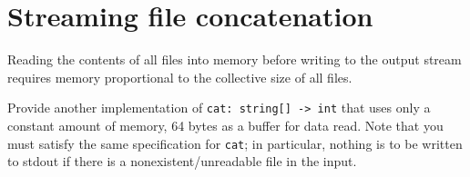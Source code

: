 \section*{Streaming file concatenation}
Reading the contents of all files into memory before writing to the output stream requires memory proportional to the collective size of all files.

Provide another implementation of \texttt{cat: string[] -> int} that uses only a constant amount of memory, 64 bytes as a buffer for data read.  Note that you must satisfy the same specification for \texttt{cat}; in particular, nothing is to be written to stdout if there is a nonexistent/unreadable file in the input.
